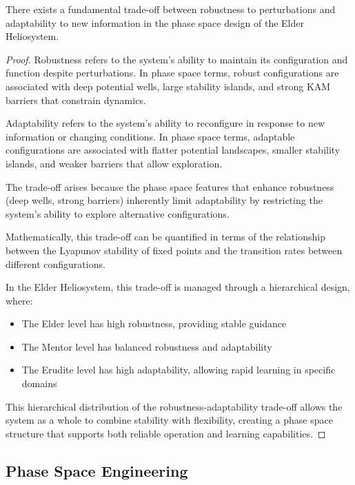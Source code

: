 \begin{theorem}
There exists a fundamental trade-off between robustness to perturbations and adaptability to new information in the phase space design of the Elder Heliosystem.
\end{theorem}

\begin{proof}
Robustness refers to the system's ability to maintain its configuration and function despite perturbations. In phase space terms, robust configurations are associated with deep potential wells, large stability islands, and strong KAM barriers that constrain dynamics.

Adaptability refers to the system's ability to reconfigure in response to new information or changing conditions. In phase space terms, adaptable configurations are associated with flatter potential landscapes, smaller stability islands, and weaker barriers that allow exploration.

The trade-off arises because the phase space features that enhance robustness (deep wells, strong barriers) inherently limit adaptability by restricting the system's ability to explore alternative configurations.

Mathematically, this trade-off can be quantified in terms of the relationship between the Lyapunov stability of fixed points and the transition rates between different configurations.

In the Elder Heliosystem, this trade-off is managed through a hierarchical design, where:
\begin{itemize}
    \item The Elder level has high robustness, providing stable guidance
    \item The Mentor level has balanced robustness and adaptability
    \item The Erudite level has high adaptability, allowing rapid learning in specific domains
\end{itemize}

This hierarchical distribution of the robustness-adaptability trade-off allows the system as a whole to combine stability with flexibility, creating a phase space structure that supports both reliable operation and learning capabilities.
\end{proof}

\subsection{Phase Space Engineering}

